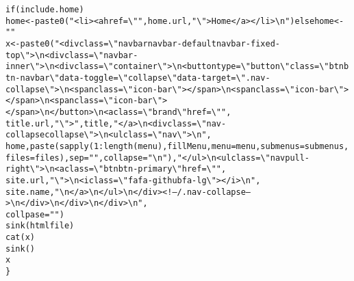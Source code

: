 \documentclass{article}\usepackage[]{graphicx}\usepackage[]{color}
\makeatletter
\newcommand{\hlnum}[1]{\textcolor[rgb]{0.863,0.196,0.184}{#1}}%
\newcommand{\hlstr}[1]{\textcolor[rgb]{0.863,0.196,0.184}{#1}}%
\newcommand{\hlopt}[1]{\textcolor[rgb]{0.576,0.631,0.631}{#1}}%
\newcommand{\hlstd}[1]{\textcolor[rgb]{0.514,0.58,0.588}{#1}}%
\newcommand{\hlkwa}[1]{\textcolor[rgb]{0.796,0.294,0.086}{#1}}%
\newcommand{\hlkwb}[1]{\textcolor[rgb]{0.522,0.6,0}{#1}}%
\newcommand{\hlkwc}[1]{\textcolor[rgb]{0.796,0.294,0.086}{#1}}%
\newcommand{\hlkwd}[1]{\textcolor[rgb]{0.576,0.631,0.631}{#1}}%
\newenvironment{kframe}{%
 \def\at@end@of@kframe{}%
 \ifinner\ifhmode%
  \def\at@end@of@kframe{\end{minipage}}%
  \begin{minipage}{\columnwidth}%
 \fi\fi%
 \def\FrameCommand##1{\hskip\@totalleftmargin \hskip-\fboxsep
 \colorbox{shadecolor}{##1}\hskip-\fboxsep
     \hskip-\linewidth \hskip-\@totalleftmargin \hskip\columnwidth}%
 \MakeFramed {\advance\hsize-\width
   \@totalleftmargin\z@ \linewidth\hsize
   \@setminipage}}%
 {\par\unskip\endMakeFramed%
 \at@end@of@kframe}
\newenvironment{knitrout}{}{} %
\makeatother
\begin{document}
\begin{knitrout}
\begin{kframe}
\begin{alltt}
    \hlkwa{if} \hlstd{(include.home)}
        \hlstd{home} \hlkwb{<-} \hlkwd{paste0}\hlstd{(}\hlstr{"<li><a href=\textbackslash{}""}\hlstd{, home.url,} \hlstr{"\textbackslash{}">Home</a></li>\textbackslash{}n          "}\hlstd{)} \hlkwa{else} \hlstd{home} \hlkwb{<-} \hlstr{""}
    \hlstd{x} \hlkwb{<-} \hlkwd{paste0}\hlstd{(}\hlstr{"<div class=\textbackslash{}"navbar navbar-default navbar-fixed-top\textbackslash{}">\textbackslash{}n  <div class=\textbackslash{}"navbar-inner\textbackslash{}">\textbackslash{}n    <div class=\textbackslash{}"container\textbackslash{}">\textbackslash{}n      <button type=\textbackslash{}"button\textbackslash{}" class=\textbackslash{}"btn btn-navbar\textbackslash{}" data-toggle=\textbackslash{}"collapse\textbackslash{}" data-target=\textbackslash{}".nav-collapse\textbackslash{}">\textbackslash{}n        <span class=\textbackslash{}"icon-bar\textbackslash{}"></span>\textbackslash{}n        <span class=\textbackslash{}"icon-bar\textbackslash{}"></span>\textbackslash{}n        <span class=\textbackslash{}"icon-bar\textbackslash{}"></span>\textbackslash{}n      </button>\textbackslash{}n      <a class=\textbackslash{}"brand\textbackslash{}" href=\textbackslash{}""}\hlstd{,}
        \hlstd{title.url,} \hlstr{"\textbackslash{}">"}\hlstd{, title,} \hlstr{"</a>\textbackslash{}n      <div class=\textbackslash{}"nav-collapse collapse\textbackslash{}">\textbackslash{}n        <ul class=\textbackslash{}"nav\textbackslash{}">\textbackslash{}n          "}\hlstd{,}
        \hlstd{home,} \hlkwd{paste}\hlstd{(}\hlkwd{sapply}\hlstd{(}\hlnum{1}\hlopt{:}\hlkwd{length}\hlstd{(menu), fillMenu,} \hlkwc{menu} \hlstd{= menu,} \hlkwc{submenus} \hlstd{= submenus,}
            \hlkwc{files} \hlstd{= files),} \hlkwc{sep} \hlstd{=} \hlstr{""}\hlstd{,} \hlkwc{collapse} \hlstd{=} \hlstr{"\textbackslash{}n          "}\hlstd{),} \hlstr{"        </ul>\textbackslash{}n        <ul class=\textbackslash{}"nav pull-right\textbackslash{}">\textbackslash{}n          <a class=\textbackslash{}"btn btn-primary\textbackslash{}" href=\textbackslash{}""}\hlstd{,}
        \hlstd{site.url,} \hlstr{"\textbackslash{}">\textbackslash{}n            <i class=\textbackslash{}"fa fa-github fa-lg\textbackslash{}"></i>\textbackslash{}n            "}\hlstd{,}
        \hlstd{site.name,} \hlstr{"\textbackslash{}n          </a>\textbackslash{}n        </ul>\textbackslash{}n      </div><!--/.nav-collapse -->\textbackslash{}n    </div>\textbackslash{}n  </div>\textbackslash{}n</div>\textbackslash{}n"}\hlstd{,}
        \hlkwc{collpase} \hlstd{=} \hlstr{""}\hlstd{)}
    \hlkwd{sink}\hlstd{(htmlfile)}
    \hlkwd{cat}\hlstd{(x)}
    \hlkwd{sink}\hlstd{()}
    \hlstd{x}
\hlstd{\}}
\end{alltt}
\end{kframe}
\end{knitrout}
\end{document}
